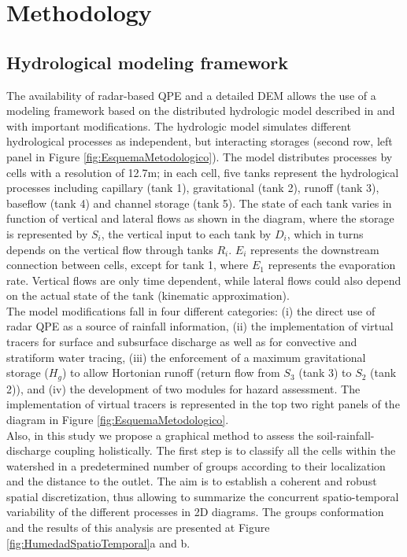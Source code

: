 \documentclass[hess, manuscript]{copernicus}
\begin{document}
\section{Methodology}
\label{sec:methods}

\subsection{Hydrological modeling framework}

The availability of radar-based QPE and a detailed DEM allows the use of a modeling framework based on the distributed hydrologic model described in \citet{Velez2001} and \citet{Frances2007b} with important modifications. The hydrologic model simulates different hydrological processes as independent, but interacting storages (second row, left panel in Figure \ref{fig:EsquemaMetodologico}).  The model distributes processes by cells with a resolution of 12.7m; in each cell, five tanks represent the hydrological processes including capillary (tank 1), gravitational (tank 2), runoff (tank 3), baseflow (tank 4) and channel storage (tank 5).  The state of each tank varies in function of vertical and lateral flows as shown in the diagram, where the storage is represented by $S_i$, the vertical input to each tank by $D_i$, which in turns depends on the vertical flow through tanks $R_i$. $E_i$ represents the downstream connection between cells, except for tank 1, where $E_1$ represents the evaporation rate. Vertical flows are only time dependent, while lateral flows could also depend on the actual state of the tank (kinematic approximation).\\

The model modifications fall in four different categories: (i) the direct use of radar QPE as a source of rainfall information, (ii) the implementation of virtual tracers for surface and subsurface discharge  as well as for convective and stratiform water tracing,  (iii)  the enforcement of a maximum gravitational storage ($H_{g}$) to allow Hortonian runoff (return flow from $S_3$ (tank 3) to $S_2$ (tank 2)), and (iv)  the development of two modules for hazard assessment. The implementation of virtual tracers is represented in the top two right panels of the diagram in Figure \ref{fig:EsquemaMetodologico}.\\

Also, in this study we propose a graphical method to assess the soil-rainfall-discharge coupling holistically. The first step is to classify all the cells within the watershed in a predetermined number of groups according to their localization and the distance to the outlet. The aim is to establish a coherent and robust spatial discretization, thus allowing to summarize the concurrent spatio-temporal variability of the different processes in 2D diagrams.  The groups conformation and the results of this analysis are presented at Figure \ref{fig:HumedadSpatioTemporal}a and b.\\
\end{document}
